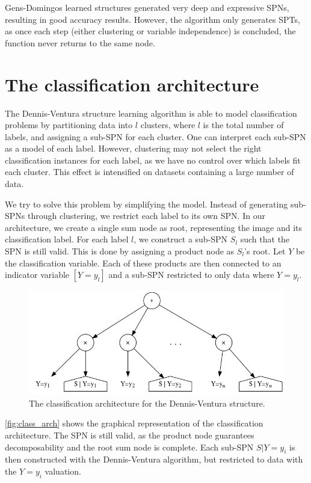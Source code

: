 Gens-Domingos learned structures generated very deep and expressive SPNs, resulting in good
accuracy results. However, the algorithm only generates SPTs, as once each step (either clustering
or variable independence) is concluded, the function never returns to the same node.

\section{The classification architecture}

The Dennis-Ventura structure learning algorithm is able to model classification problems by
partitioning data into $l$ clusters, where $l$ is the total number of labels, and assigning a
sub-SPN for each cluster. One can interpret each sub-SPN as a model of each label. However,
clustering may not select the right classification instances for each label, as we have no control
over which labels fit each cluster. This effect is intensified on datasets containing a large
number of data.

We try to solve this problem by simplifying the model. Instead of generating sub-SPNs through
clustering, we restrict each label to its own SPN\@. In our architecture, we create a single sum
node as root, representing the image and its classification label. For each label $l$, we construct
a sub-SPN $S_l$ such that the SPN is still valid. This is done by assigning a product node as
$S_l$'s root. Let $Y$ be the classification variable. Each of these products are then connected to
an indicator variable $[Y=y_l]$ and a sub-SPN restricted to only data where $Y=y_l$.

\begin{figure}[h]
  \centering\includegraphics[scale=0.5]{graphs/classarch.png}
  \caption{The classification architecture for the Dennis-Ventura structure.\label{fig:class_arch}}
\end{figure}

\autoref{fig:class_arch} shows the graphical representation of the classification architecture. The
SPN is still valid, as the product node guarantees decomposability and the root sum node is
complete. Each sub-SPN $S|Y=y_i$ is then constructed with the Dennis-Ventura algorithm, but
restricted to data with the $Y=y_i$ valuation.

